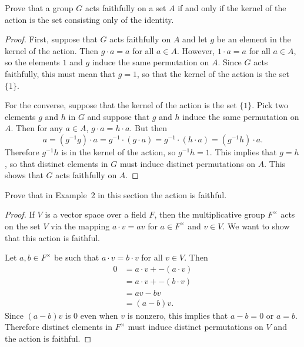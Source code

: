  Prove that a group $G$ acts faithfully on a set $A$ if and
only if the kernel of the action is the set consisting only of the
identity.
\begin{proof}
  First, suppose that $G$ acts faithfully on $A$ and let $g$ be an
  element in the kernel of the action. Then $g\cdot a = a$ for all
  $a\in A$. However, $1\cdot a = a$ for all $a\in A$, so the elements
  $1$ and $g$ induce the same permutation on $A$. Since $G$ acts
  faithfully, this must mean that $g = 1$, so that the kernel of the
  action is the set $\{1\}$.

  For the converse, suppose that the kernel of the action is the set
  $\{1\}$. Pick two elements $g$ and $h$ in $G$ and suppose that $g$
  and $h$ induce the same permutation on $A$. Then for any $a\in A$,
  $g\cdot a = h\cdot a$. But then
  \begin{equation*}
    a = (g^{-1}g)\cdot a = g^{-1}\cdot(g\cdot a)
    = g^{-1}\cdot(h\cdot a) = (g^{-1}h)\cdot a.
  \end{equation*}
  Therefore $g^{-1}h$ is in the kernel of the action, so
  $g^{-1}h = 1$. This implies that $g = h$, so that distinct elements
  in $G$ must induce distinct permutations on $A$. This shows that $G$
  acts faithfully on $A$.
\end{proof}

 Prove that in Example~2 in this section the action is
faithful.
\begin{proof}
  If $V$ is a vector space over a field $F$, then the multiplicative
  group $F^\times$ acts on the set $V$ via the mapping $a\cdot v = av$
  for $a\in F^\times$ and $v\in V$. We want to show that this action
  is faithful.

  Let $a,b\in F^\times$ be such that $a\cdot v = b\cdot v$ for all
  $v\in V$. Then
  \begin{align*}
    0 &= a\cdot v + -(a\cdot v) \\
      &= a\cdot v + -(b\cdot v) \\
      &= av - bv \\
      &= (a - b)v.
  \end{align*}
  Since $(a - b)v$ is $0$ even when $v$ is nonzero, this implies that
  $a - b = 0$ or $a = b$. Therefore distinct elements in $F^\times$
  must induce distinct permutations on $V$ and the action is faithful.
\end{proof}

